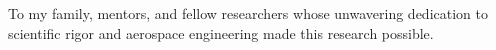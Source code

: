 \begin{dedication}
To my family, mentors, and fellow researchers whose unwavering dedication to scientific rigor and aerospace engineering made this research possible.
\end{dedication}
